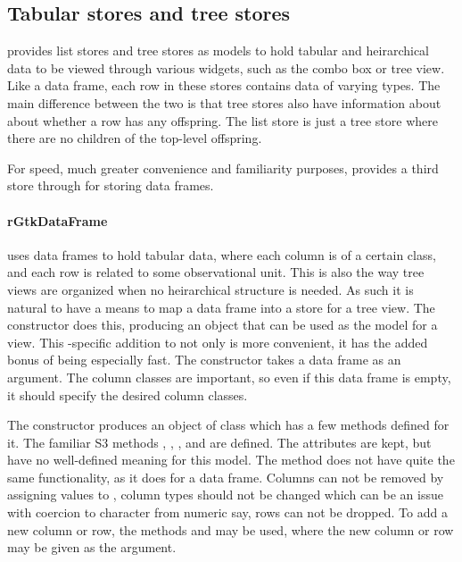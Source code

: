 \subsection{Tabular  stores and tree stores}
\label{sec:tabular-stores-tree}

\GTK\/ provides list stores and tree stores as models to hold tabular and
heirarchical data to be viewed through various widgets, such as the
combo box or tree view. Like a data frame, each row in these stores
contains data of varying types. The main difference between the two is
that tree stores also have information about about whether a row has
any offspring. The list store is just a tree store where there
are no children of the top-level offspring.

For speed, much greater convenience and familiarity purposes,  provides a third store
through  for storing data frames.

\paragraph{rGtkDataFrame}

\R\/ uses data frames to hold tabular data, where each column is of a
certain class, and each row is related to some observational
unit. This is also the way tree views are organized when no
heirarchical structure is needed. As such it is natural to have a
means to map a data frame into a store for a tree view. The
 constructor does this, producing an object
that can be used as the model for a view. This \R-specific
addition to \GTK\/ not only is more convenient, it has the added bonus
of being especially fast. The constructor takes a data frame as an
argument. The column classes are important, so even if this data frame
is empty, it should specify the desired column classes.

The constructor produces an object of class 
which has a few methods defined for it. The familiar S3 methods
\method{[}{RGtkDataFrame}, \method{[\ASSIGN}{RGtkDataFrame},
, and 
are defined. The  attributes are kept, but have no
well-defined meaning
for this model. The \code{[$<$-} method does not have quite the same
functionality, as it does for a data frame. Columns can not be removed
by assigning values to , column types
should not be changed which can be an issue with coercion to character from numeric
say, rows can not be dropped. To add a new column or row, the methods
 and
 may be used, where the new column
or row may be given as the argument.

